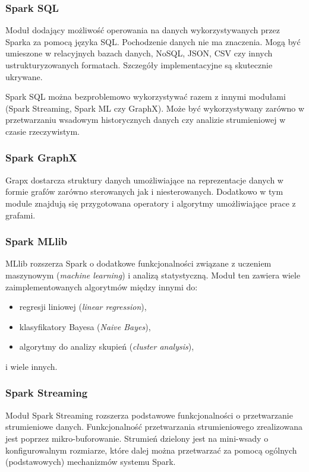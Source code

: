 \subsubsection*{Spark SQL}
Moduł dodający możliwość operowania na danych wykorzystywanych przez Sparka za pomocą języka SQL.
Pochodzenie danych nie ma znaczenia. Mogą być umieszone w
relacyjnych bazach danych, NoSQL, JSON, CSV czy innych ustrukturyzowanych formatach.
Szczegóły implementacyjne są skutecznie ukrywane.

Spark SQL można bezproblemowo wykorzystywać razem z innymi modułami (Spark Streaming, Spark ML czy GraphX).
Może być wykorzystywany zarówno w przetwarzaniu wsadowym historycznych danych
czy analizie strumieniowej w czasie rzeczywistym.
\subsubsection*{Spark GraphX}
Grapx dostarcza struktury danych umożliwiające na reprezentacje danych w formie grafów
zarówno sterowanych jak i niesterowanych.
Dodatkowo w tym module znajdują się przygotowana operatory i algorytmy umożliwiające prace z grafami.
\subsubsection*{Spark MLlib}
MLlib rozszerza Spark o dodatkowe funkcjonalności związane z uczeniem maszynowym (\textit{machine learning})
i analizą statystyczną.
Moduł ten zawiera wiele zaimplementowanych algorytmów między innymi do:
\begin{itemize}
  \item regresji liniowej (\textit{linear regression}),
  \item klasyfikatory Bayesa (\textit{Naive Bayes}),
  \item algorytmy do analizy skupień (\textit{cluster analysis}),
\end{itemize}
i wiele innych.
\subsubsection*{Spark Streaming}
Moduł Spark Streaming rozszerza podstawowe funkcjonalności o przetwarzanie strumieniowe danych.
Funkcjonalność przetwarzania strumieniowego zrealizowana jest poprzez mikro-buforowanie.
Strumień dzielony jest na mini-wsady o konfigurowalnym rozmiarze,
które dalej można przetwarzać za pomocą ogólnych (podstawowych) mechanizmów systemu Spark.

